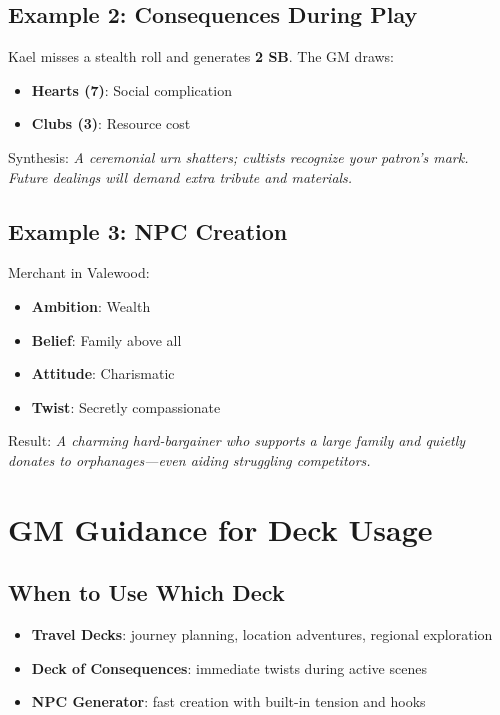 \subsection{Example 2: Consequences During Play}
\label{subsec:example-consequences}

Kael misses a stealth roll and generates \textbf{2 SB}. The GM draws:
\begin{itemize}
\item \textbf{Hearts (7)}: Social complication
\item \textbf{Clubs (3)}: Resource cost
\end{itemize}
Synthesis: \emph{A ceremonial urn shatters; cultists recognize your patron’s mark. Future dealings will demand extra tribute and materials.}

\subsection{Example 3: NPC Creation}
\label{subsec:example-npc}

Merchant in Valewood:
\begin{itemize}
\item \textbf{Ambition}: Wealth
\item \textbf{Belief}: Family above all
\item \textbf{Attitude}: Charismatic
\item \textbf{Twist}: Secretly compassionate
\end{itemize}
Result: \emph{A charming hard-bargainer who supports a large family and quietly donates to orphanages—even aiding struggling competitors.}

\section{GM Guidance for Deck Usage}
\label{sec:deck-guidance}

\subsection{When to Use Which Deck}
\label{subsec:deck-selection}

\begin{itemize}
\item \textbf{Travel Decks}: journey planning, location adventures, regional exploration
\item \textbf{Deck of Consequences}: immediate twists during active scenes
\item \textbf{NPC Generator}: fast creation with built-in tension and hooks
\end{itemize}

